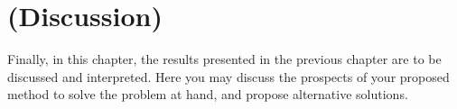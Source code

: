 \chapter{(Discussion)}
\label{chap:discussion}


Finally, in this chapter, the results presented in the previous chapter are to be discussed and interpreted.
Here you may discuss the prospects of your proposed method to solve the problem at hand, and propose alternative solutions.

